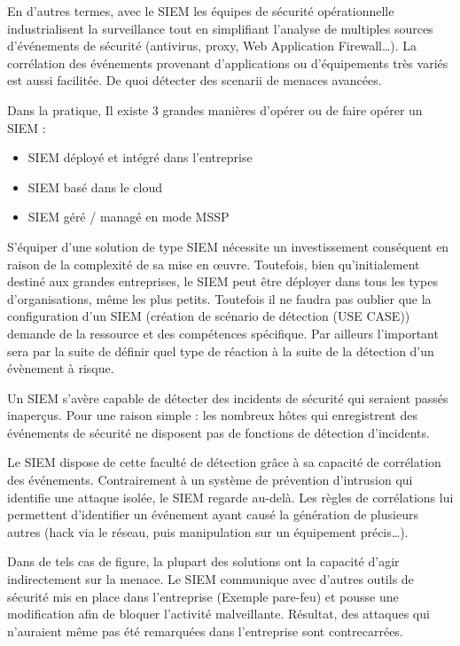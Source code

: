 En d’autres termes, avec le SIEM les équipes de sécurité opérationnelle industrialisent la surveillance tout en simplifiant l’analyse de multiples sources d’événements de sécurité (antivirus, proxy, Web Application Firewall…). La corrélation des événements provenant d’applications ou d’équipements très variés est aussi facilitée. De quoi détecter des scenarii de menaces avancées.

Dans la pratique, Il existe 3 grandes manières d'opérer ou de faire opérer un SIEM :

\begin{itemize}
  \item SIEM  déployé et intégré dans l'entreprise
  \item SIEM basé dans le cloud
  \item SIEM géré / managé en mode MSSP
\end{itemize}

S'équiper d’une solution de type SIEM nécessite un investissement conséquent en raison de la complexité de sa mise en œuvre. Toutefois, bien qu’initialement destiné aux grandes entreprises, le SIEM peut être déployer dans tous les types d’organisations, même les plus petits. Toutefois il ne faudra pas oublier que la configuration d'un SIEM (création de scénario de détection (USE CASE)) demande de la ressource et des compétences spécifique.
Par ailleurs l'important sera par la suite de définir quel type de réaction à la suite de la détection d'un évènement à risque.


Un SIEM s’avère capable de détecter des incidents de sécurité qui seraient passés inaperçus. Pour une raison simple : les nombreux hôtes qui enregistrent des événements de sécurité ne disposent pas de fonctions de détection d’incidents.

Le SIEM dispose de cette faculté de détection grâce à sa capacité de corrélation des événements. Contrairement à un système de prévention d’intrusion qui identifie une attaque isolée, le SIEM regarde au-delà. Les règles de corrélations lui permettent d’identifier un événement ayant causé la génération de plusieurs autres (hack via le réseau, puis manipulation sur un équipement précis…).

Dans de tels cas de figure, la plupart des solutions ont la capacité d’agir indirectement sur la menace. Le SIEM communique avec d’autres outils de sécurité mis en place dans l’entreprise (Exemple pare-feu) et pousse une modification afin de bloquer l’activité malveillante. Résultat, des attaques qui n’auraient même pas été remarquées dans l’entreprise sont contrecarrées.

